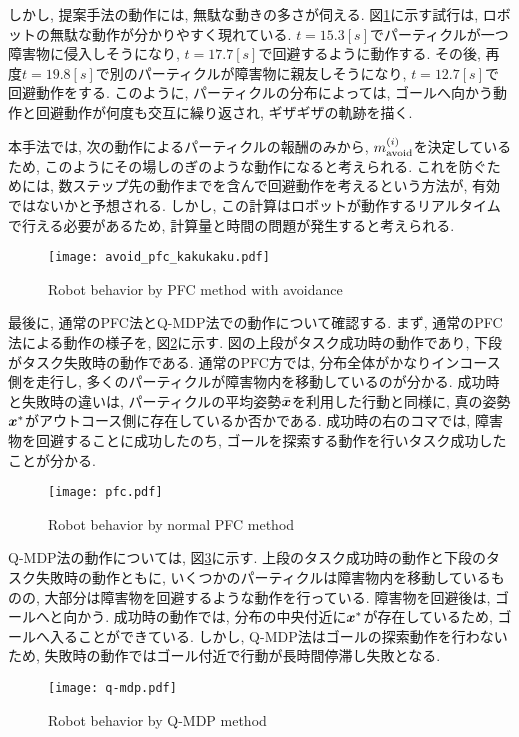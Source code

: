 しかし, 提案手法の動作には, 無駄な動きの多さが伺える. 
図\ref{fig:avoid pfc kakukaku}に示す試行は, ロボットの無駄な動作が分かりやすく現れている. 
$t=15.3[\si{s}]$でパーティクルが一つ障害物に侵入しそうになり, $t=17.7[\si{s}]$で回避するように動作する. 
その後, 再度$t=19.8[\si{s}]$で別のパーティクルが障害物に親友しそうになり, $t=12.7[\si{s}]$で回避動作をする. 
このように, パーティクルの分布によっては, ゴールへ向かう動作と回避動作が何度も交互に繰り返され, ギザギザの軌跡を描く. 

本手法では, 次の動作によるパーティクルの報酬のみから, $m^{(i)}_{\rm avoid}$を決定しているため, 
このようにその場しのぎのような動作になると考えられる. 
これを防ぐためには, 数ステップ先の動作までを含んで回避動作を考えるという方法が, 有効ではないかと予想される. 
しかし, この計算はロボットが動作するリアルタイムで行える必要があるため, 計算量と時間の問題が発生すると考えられる. 

\begin{figure}[H]
  \begin{center}
    \texttt{[image: avoid\_pfc\_kakukaku.pdf]}
    \caption{Robot behavior by PFC method with avoidance}
    \label{fig:avoid pfc kakukaku}
  \end{center}
\end{figure}

最後に, 通常のPFC法とQ-MDP法での動作について確認する. 
まず, 通常のPFC法による動作の様子を, 図\ref{fig:pfc}に示す. 
図の上段がタスク成功時の動作であり, 下段がタスク失敗時の動作である. 
通常のPFC方では, 分布全体がかなりインコース側を走行し, 多くのパーティクルが障害物内を移動しているのが分かる. 
成功時と失敗時の違いは, パーティクルの平均姿勢$\bar{\boldsymbol{x}}$を利用した行動と同様に, 真の姿勢$\boldsymbol{x}^{*}$がアウトコース側に存在しているか否かである. 
成功時の右のコマでは, 障害物を回避することに成功したのち, ゴールを探索する動作を行いタスク成功したことが分かる. 

\begin{figure}[H]
  \begin{center}
    \texttt{[image: pfc.pdf]}
    \caption{Robot behavior by normal PFC method}
    \label{fig:pfc}
  \end{center}
\end{figure}

Q-MDP法の動作については, 図\ref{fig:q-mdp}に示す. 
上段のタスク成功時の動作と下段のタスク失敗時の動作ともに, いくつかのパーティクルは障害物内を移動しているものの, 
大部分は障害物を回避するような動作を行っている. 
障害物を回避後は, ゴールへと向かう. 
成功時の動作では, 分布の中央付近に$\boldsymbol{x}^{*}$が存在しているため, ゴールへ入ることができている. 
しかし, Q-MDP法はゴールの探索動作を行わないため, 失敗時の動作ではゴール付近で行動が長時間停滞し失敗となる. 

\begin{figure}[H]
  \begin{center}
    \texttt{[image: q-mdp.pdf]}
    \caption{Robot behavior by Q-MDP method}
    \label{fig:q-mdp}
  \end{center}
\end{figure}

